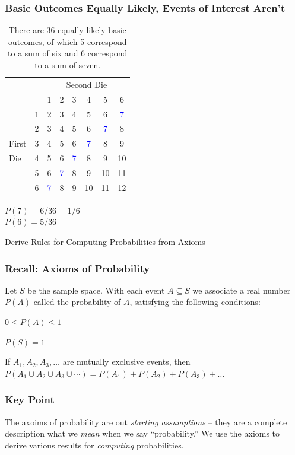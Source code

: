 \documentclass[handout]{beamer}
\begin{document}
\begin{frame}
\frametitle{Basic Outcomes Equally Likely, Events of Interest Aren't}

\begin{table}
	\begin{tabular}{|lr|cccccc|}
	\hline
	&&\multicolumn{6}{|c|}{Second Die}\\
	&&1&2&3&4&5&6\\
	\hline
	&1&2&3&4&5&\alert{6}&\textcolor{blue}{7}\\
	&2&3&4&5&\alert{6}&\textcolor{blue}{7}&8\\
	First&3&4&5&\alert{6}&\textcolor{blue}{7}&8&9\\
	Die&4&5&\alert{6}&\textcolor{blue}{7}&8&9&10\\
	&5&\alert{6}&\textcolor{blue}{7}&8&9&10&11\\
	&6&\textcolor{blue}{7}&8&9&10&11&12\\
	\hline
	\end{tabular}
	\caption{There are 36 equally likely basic outcomes, of which 5 correspond to a sum of six and 6 correspond to a sum of  seven.}
\end{table}
	\alert{$P(7) = 6/36 = 1/6$}\\
	\alert{$P(6) = 5/36$}
\end{frame}
\begin{frame}

\begin{center}\Huge Derive Rules for Computing Probabilities from Axioms\end{center}
\end{frame}
\begin{frame}
\frametitle{Recall: Axioms of Probability}

Let $S$ be the sample space. With each event $A \subseteq S$ we associate a real number $P(A)$ called the \alert{probability of $A$}, satisfying the following conditions:
\vspace{1em}
\begin{description}\pause
	\item[Axiom 1] $0 \leq P(A) \leq 1$ \pause
	\item[Axiom 2] $P(S)=1$ \pause
	\item[Axiom 3] If $A_1, A_2, A_3, \hdots$ are mutually exclusive events, then $P(A_1\cup A_2 \cup A_3 \cup \cdots) = P(A_1) + P(A_2) + P(A_3) + \hdots$
\end{description}

\end{frame}
\begin{frame}
\frametitle{Key Point}
The axoims of probability are out \emph{\alert{starting assumptions}} -- they are a complete description what we \emph{\alert{mean}} when we say ``probability.'' We use the axioms to derive various results for \emph{\alert{computing}} probabilities.
\end{frame}
\end{document}
